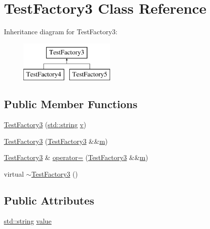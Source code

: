 \hypertarget{class_test_factory3}{}\section{Test\+Factory3 Class Reference}
\label{class_test_factory3}
Inheritance diagram for Test\+Factory3\+:\begin{figure}[H]
\begin{center}
\leavevmode
\includegraphics[height=2.000000cm]{class_test_factory3}
\end{center}
\end{figure}
\subsection*{Public Member Functions}
\begin{DoxyCompactItemize}
\item 
\mbox{\hyperlink{class_test_factory3_a858fcd9e8bfaf710a1438c0789cb315b}{Test\+Factory3}} (\mbox{\hyperlink{_s_d_l__opengl__glext_8h_ab4ccfaa8ab0e1afaae94dc96ef52dde1}{std\+::string}} \mbox{\hyperlink{_s_d_l__opengl_8h_a10a82eabcb59d2fcd74acee063775f90}{v}})
\item 
\mbox{\hyperlink{class_test_factory3_a6ea348498822ed5cf46725eba60ed13f}{Test\+Factory3}} (\mbox{\hyperlink{class_test_factory3}{Test\+Factory3}} \&\&\mbox{\hyperlink{_s_d_l__opengl__glext_8h_af593500c283bf1a787a6f947f503a5c2}{m}})
\item 
\mbox{\hyperlink{class_test_factory3}{Test\+Factory3}} \& \mbox{\hyperlink{class_test_factory3_a6c1c6d677d9d78a0d1bf2e9f4963f22b}{operator=}} (\mbox{\hyperlink{class_test_factory3}{Test\+Factory3}} \&\&\mbox{\hyperlink{_s_d_l__opengl__glext_8h_af593500c283bf1a787a6f947f503a5c2}{m}})
\item 
virtual \mbox{\hyperlink{class_test_factory3_abcd1c4b3f45f260b91580aad9c9e6a0a}{$\sim$\+Test\+Factory3}} ()
\end{DoxyCompactItemize}
\subsection*{Public Attributes}
\begin{DoxyCompactItemize}
\item 
\mbox{\hyperlink{_s_d_l__opengl__glext_8h_ab4ccfaa8ab0e1afaae94dc96ef52dde1}{std\+::string}} \mbox{\hyperlink{class_test_factory3_ae7cab154a489769687ea982c2962a074}{value}}
\end{DoxyCompactItemize}
